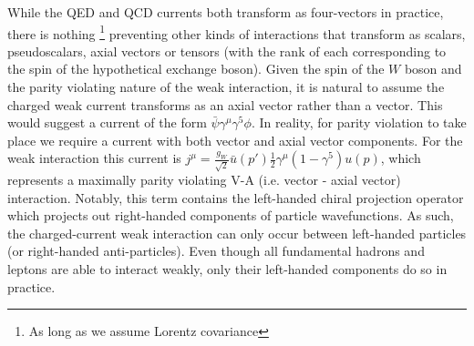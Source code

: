 While the QED and QCD currents both transform as four-vectors in practice,  there is nothing \footnote{As long as 
we assume Lorentz covariance} preventing other kinds of interactions that transform as scalars, pseudoscalars, axial 
vectors or tensors (with the rank of each corresponding to the spin of the hypothetical exchange boson). Given the 
spin of the $W$ boson and the parity violating nature of the weak interaction, it is natural to assume the charged 
weak current transforms as an axial vector rather than a vector. This would suggest a current of the form 
$\bar{\psi}\gamma^{\mu}\gamma^{5}\phi$. In reality, for parity violation to take place we require a current with both 
vector and axial vector components. For the weak interaction this current is
$j^{\mu} = \frac{g_W}{\sqrt{2}}\bar{u}(p')\frac{1}{2}\gamma^{\mu}(1-\gamma^{5})u(p)$, which represents a 
maximally parity violating V-A (i.e. vector - axial vector) interaction. Notably, this term contains the left-handed 
chiral projection operator which projects out right-handed components of particle wavefunctions. As such,  the 
charged-current weak interaction can only occur between left-handed particles (or right-handed anti-particles). 
Even though all fundamental hadrons and leptons are able to interact weakly, only their left-handed components do 
so in practice.\par

